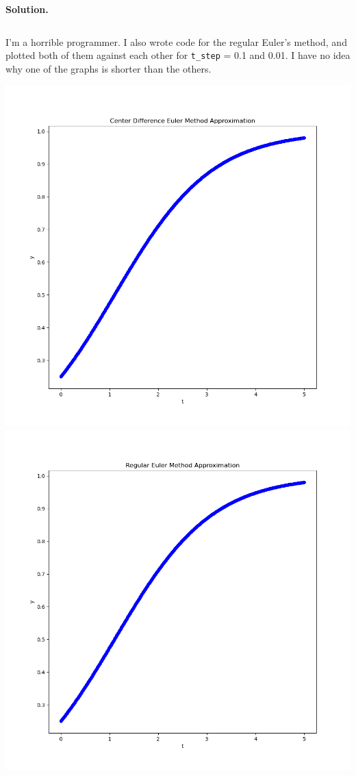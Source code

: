 \documentclass[11pt, letterpaper]{report}
\newenvironment{soln}[1][]{\noindent\textbf{Solution. }}{\hfill\qedsymbol}
\begin{document}
\begin{soln}
\begin{lstlisting}[language=python]
	\end{lstlisting}
	I'm a horrible programmer. I also wrote code for the regular Euler's method, and plotted both of them against each other for \verb|t_step| = 0.1 and 0.01. I have no idea why one of the graphs is shorter than the others.
	\begin{center}
		\includegraphics[scale=0.35]{CenterEuler.png}
		\includegraphics[scale=0.35]{Euler.png}

\end{center}
\end{soln}
\end{document}
